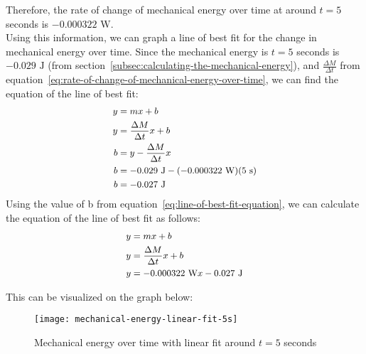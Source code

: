 \documentclass[titlepage]{article}
\begin{document}
            Therefore, the rate of change of mechanical energy over time at around $t = 5$ seconds is $-0.000322 \text{ W}$. \\
            Using this information, we can graph a line of best fit for the change in mechanical energy over time.
            \newline \indent Since the mechanical energy is $t=5$ seconds is $-0.029 \text{ J}$ (from section~\ref{subsec:calculating-the-mechanical-energy}), and $\frac{\Delta M}{\Delta t}$ from equation~\ref{eq:rate-of-change-of-mechanical-energy-over-time}, we can find the equation of the line of best fit:
            \begin{equation}
                \small
                \begin{aligned}
                    y &= mx + b \\
                    y &= \frac{\Delta M}{\Delta t}x + b \\
                    b &= y - \frac{\Delta M}{\Delta t}x \\
                    b &= -0.029 \text{ J} - (-0.000322 \text{ W})(5 \text{ s}) \\
                    b &= -0.027 \text{ J} \\
                \end{aligned}\label{eq:line-of-best-fit-equation}
            \end{equation}
            Using the value of b from equation~\ref{eq:line-of-best-fit-equation}, we can calculate the equation of the line of best fit as follows:
            \begin{equation}
                \small
                \begin{aligned}
                    y &= mx + b \\
                    y &= \frac{\Delta M}{\Delta t}x + b \\
                    y &= -0.000322 \text{ W}x - 0.027 \text{ J} \\
                \end{aligned}\label{eq:line-of-best-fit-equation-around-5-seconds}
            \end{equation}
            
            This can be visualized on the graph below:
            
            \begin{figure}[H]
                \centering
                \texttt{[image: mechanical-energy-linear-fit-5s]}
                \caption{Mechanical energy over time with linear fit around $t=5$ seconds}
                \label{fig:mechanical-energy-linear-fit-5s}
            \end{figure}
            
\end{document}
